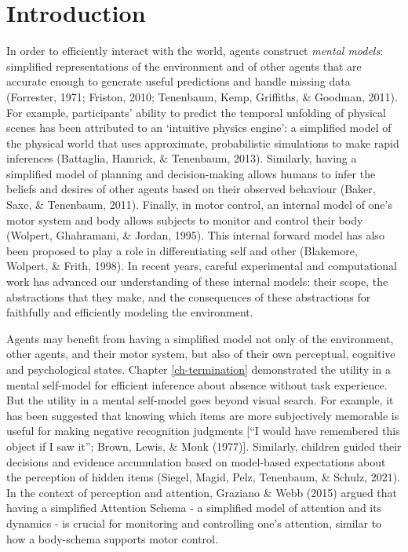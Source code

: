 \documentclass[12pt,twoside]{reedthesis}
\begin{document}
\hypertarget{introduction-2}{%
\section{Introduction}\label{introduction-2}}

In order to efficiently interact with the world, agents construct \emph{mental models}: simplified representations of the environment and of other agents that are accurate enough to generate useful predictions and handle missing data (Forrester, 1971; Friston, 2010; Tenenbaum, Kemp, Griffiths, \& Goodman, 2011). For example, participants' ability to predict the temporal unfolding of physical scenes has been attributed to an `intuitive physics engine': a simplified model of the physical world that uses approximate, probabilistic simulations to make rapid inferences (Battaglia, Hamrick, \& Tenenbaum, 2013). Similarly, having a simplified model of planning and decision-making allows humans to infer the beliefs and desires of other agents based on their observed behaviour (Baker, Saxe, \& Tenenbaum, 2011). Finally, in motor control, an internal model of one's motor system and body allows subjects to monitor and control their body (Wolpert, Ghahramani, \& Jordan, 1995). This internal forward model has also been proposed to play a role in differentiating self and other (Blakemore, Wolpert, \& Frith, 1998). In recent years, careful experimental and computational work has advanced our understanding of these internal models: their scope, the abstractions that they make, and the consequences of these abstractions for faithfully and efficiently modeling the environment.

Agents may benefit from having a simplified model not only of the environment, other agents, and their motor system, but also of their own perceptual, cognitive and psychological states. Chapter \ref{ch-termination} demonstrated the utility in a mental self-model for efficient inference about absence without task experience. But the utility in a mental self-model goes beyond visual search. For example, it has been suggested that knowing which items are more subjectively memorable is useful for making negative recognition judgments {[}``I would have remembered this object if I saw it''; Brown, Lewis, \& Monk (1977){]}. Similarly, children guided their decisions and evidence accumulation based on model-based expectations about the perception of hidden items (Siegel, Magid, Pelz, Tenenbaum, \& Schulz, 2021). In the context of perception and attention, Graziano \& Webb (2015) argued that having a simplified Attention Schema - a simplified model of attention and its dynamics - is crucial for monitoring and controlling one's attention, similar to how a body-schema supports motor control.
\end{document}
